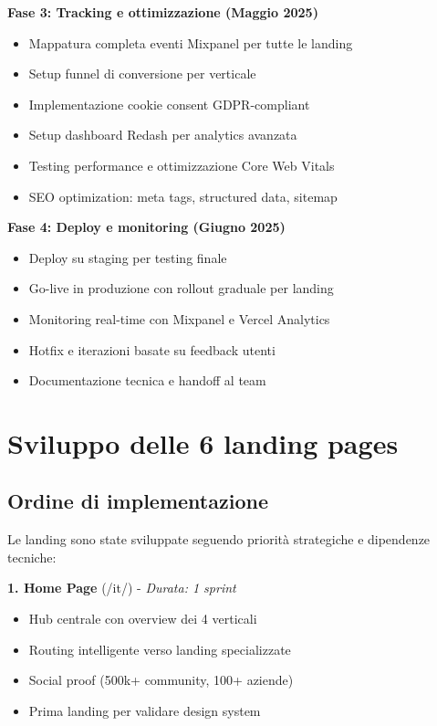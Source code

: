 \textbf{Fase 3: Tracking e ottimizzazione (Maggio 2025)}
\begin{itemize}
  \item Mappatura completa eventi Mixpanel per tutte le landing
  \item Setup funnel di conversione per verticale
  \item Implementazione cookie consent GDPR-compliant
  \item Setup dashboard Redash per analytics avanzata
  \item Testing performance e ottimizzazione Core Web Vitals
  \item SEO optimization: meta tags, structured data, sitemap
\end{itemize}

\textbf{Fase 4: Deploy e monitoring (Giugno 2025)}
\begin{itemize}
  \item Deploy su staging per testing finale
  \item Go-live in produzione con rollout graduale per landing
  \item Monitoring real-time con Mixpanel e Vercel Analytics
  \item Hotfix e iterazioni basate su feedback utenti
  \item Documentazione tecnica e handoff al team
\end{itemize}

\section{Sviluppo delle 6 landing pages}

\subsection{Ordine di implementazione}
Le landing sono state sviluppate seguendo priorità strategiche e 
dipendenze tecniche:

\textbf{1. Home Page} (/it/) - \textit{Durata: 1 sprint}
\begin{itemize}
  \item Hub centrale con overview dei 4 verticali
  \item Routing intelligente verso landing specializzate
  \item Social proof (500k+ community, 100+ aziende)
  \item Prima landing per validare design system
\end{itemize}

